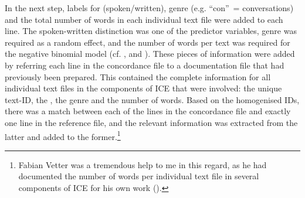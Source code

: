 In the next step, labels for  (spoken/written), genre (e.g. “con”~= conversations) and the total number of words in each individual text file were added to each line. The spoken-written distinction was one of the predictor variables, genre was required as a random effect, and the number of words per text was required for the negative binomial model (cf. ,  and ). These pieces of information were added by referring each line in the concordance file to a documentation file that had previously been prepared. This contained the complete information for all individual text files in the components of ICE that were involved: the unique text-ID, the , the genre and the number of words. Based on the homogenised IDs, there was a match between each of the lines in the concordance file and exactly one line in the reference file, and the relevant information was extracted from the latter and added to the former.\footnote{Fabian Vetter was a tremendous help to me in this regard, as he had documented the number of words per individual text file in several components of ICE for his own work (\citealt{Vetter2021,Vetter2022}).}

